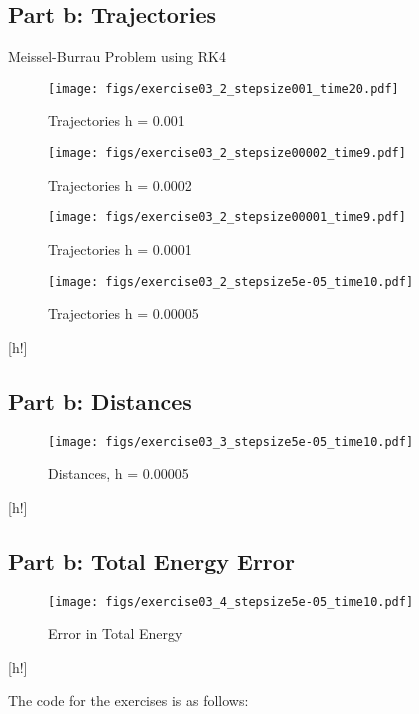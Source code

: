 \documentclass[12pt,a4paper,twoside]{article}
\begin{document}
\subsection*{Part b: Trajectories}
Meissel-Burrau Problem using RK4

\begin{figure}[h]
  \centering
  \texttt{[image: figs/exercise03\_2\_stepsize001\_time20.pdf]}
  \caption{Trajectories h = 0.001}
\end{figure}
\begin{figure}[h]
  \centering
  \texttt{[image: figs/exercise03\_2\_stepsize00002\_time9.pdf]}
  \caption{Trajectories h = 0.0002}
\end{figure}
\begin{figure}[h]
   \centering
   \texttt{[image: figs/exercise03\_2\_stepsize00001\_time9.pdf]}
   \caption{Trajectories h = 0.0001}
\end{figure}
\begin{figure}[h]
  \centering
  \texttt{[image: figs/exercise03\_2\_stepsize5e-05\_time10.pdf]}
  \caption{Trajectories h = 0.00005}
\end{figure}[h!]

\subsection*{Part b: Distances}
\begin{figure}[h!]
  \centering
  \texttt{[image: figs/exercise03\_3\_stepsize5e-05\_time10.pdf]}
  \caption{Distances, h = 0.00005}
\end{figure}[h!]

\subsection*{Part b: Total Energy Error}
\begin{figure}[h!]
  \centering
  \texttt{[image: figs/exercise03\_4\_stepsize5e-05\_time10.pdf]}
  \caption{Error in Total Energy}
\end{figure}[h!]

%
The code for the exercises is as follows:
%
%
\end{document}
